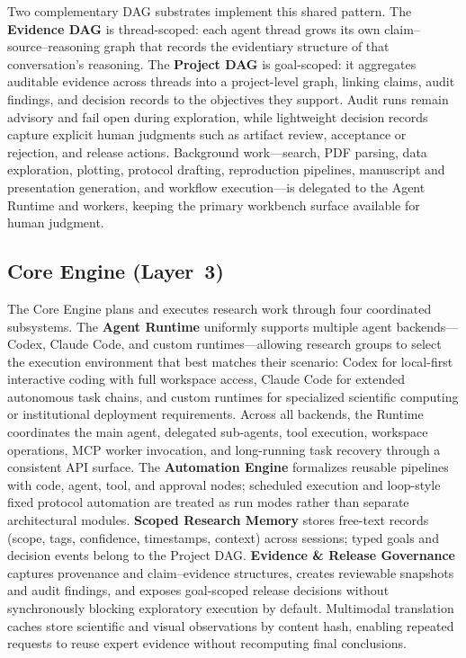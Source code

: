 \documentclass[sn-basic,Numbered,pdflatex]{sn-jnl}
\begin{document}
Two complementary DAG substrates implement this shared pattern. The \textbf{Evidence DAG} is thread-scoped: each agent thread grows its own claim--source--reasoning graph that records the evidentiary structure of that conversation's reasoning. The \textbf{Project DAG} is goal-scoped: it aggregates auditable evidence across threads into a project-level graph, linking claims, audit findings, and decision records to the objectives they support. Audit runs remain advisory and fail open during exploration, while lightweight decision records capture explicit human judgments such as artifact review, acceptance or rejection, and release actions. Background work---search, PDF parsing, data exploration, plotting, protocol drafting, reproduction pipelines, manuscript and presentation generation, and workflow execution---is delegated to the Agent Runtime and workers, keeping the primary workbench surface available for human judgment.

\subsection{Core Engine (Layer~3)}
The Core Engine plans and executes research work through four coordinated subsystems. The \textbf{Agent Runtime} uniformly supports multiple agent backends---Codex, Claude Code, and custom runtimes---allowing research groups to select the execution environment that best matches their scenario: Codex for local-first interactive coding with full workspace access, Claude Code for extended autonomous task chains, and custom runtimes for specialized scientific computing or institutional deployment requirements. Across all backends, the Runtime coordinates the main agent, delegated sub-agents, tool execution, workspace operations, MCP worker invocation, and long-running task recovery through a consistent API surface. The \textbf{Automation Engine} formalizes reusable pipelines with code, agent, tool, and approval nodes; scheduled execution and loop-style fixed protocol automation are treated as run modes rather than separate architectural modules. \textbf{Scoped Research Memory} stores free-text records (scope, tags, confidence, timestamps, context) across sessions; typed goals and decision events belong to the Project DAG. \textbf{Evidence \& Release Governance} captures provenance and claim--evidence structures, creates reviewable snapshots and audit findings, and exposes goal-scoped release decisions without synchronously blocking exploratory execution by default. Multimodal translation caches store scientific and visual observations by content hash, enabling repeated requests to reuse expert evidence without recomputing final conclusions.
\end{document}
